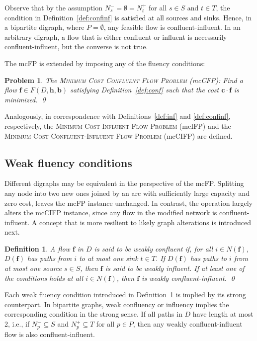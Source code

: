\documentclass[pdflatex,sn-mathphys-num]{sn-jnl}%
\theoremstyle{thmstyleone}%
\newtheorem{definition}[theorem]{Definition}%
\newtheorem{problem}[theorem]{Problem}%
\begin{document}
Observe that by the assumption $N_s^-=\emptyset=N_t^+$ for all $s\in S$ and $t\in T$,
the condition in Definition~\ref{def:confinf} is satisfied at all sources and sinks.
Hence, in a bipartite digraph, where $P=\emptyset$, any feasible flow is confluent-influent.
In an arbitrary digraph, a flow that is either confluent or influent is necessarily confluent-influent, but the converse is not true.

The mcFP is extended by imposing any of the fluency conditions:
\begin{problem} \label{prob:conf}
The \textsc{Minimum Cost Confluent Flow Problem} (mcCFP):
Find a flow $\boldsymbol{f}\in F(D,\boldsymbol{h},\boldsymbol{b})$ satisfying Definition~\ref{def:conf} such that the cost $\boldsymbol{c}\cdot\boldsymbol{f}$ is minimized.
\qed
\end{problem}
\noindent
Analogously, in correspondence with Definitions~\ref{def:inf} and \ref{def:confinf}, respectively, the 
\textsc{Minimum Cost Influent Flow Problem} (mcIFP) and the \textsc{Minimum Cost Confluent-Influent Flow Problem} (mcCIFP) are defined.

\subsection{Weak fluency conditions} \label{sec:weak}

Different digraphs may be equivalent in the perspective of the mcFP.
Splitting any node into two new ones joined by an arc with sufficiently large capacity and zero cost, leaves the mcFP instance unchanged.
In contrast, the operation largely alters the mcCIFP instance, since any flow in the modified network is confluent-influent.
A concept that is more resilient to likely graph alterations is introduced next.

\begin{definition} \label{def:weakconfinf}
A flow $\boldsymbol{f}$ in $D$ is said to be \emph{weakly confluent} if, for all $i\in N(\boldsymbol{f})$,
$D(\boldsymbol{f})$ has paths from $i$ to at most one sink $t\in T$.
If $D(\boldsymbol{f})$ has paths to $i$ from at most one source $s\in S$, then $\boldsymbol{f}$ is said to be \emph{weakly influent}.
If at least one of the conditions holds at all $i\in N(\boldsymbol{f})$, then $\boldsymbol{f}$ is \emph{weakly confluent-influent}.
\qed
\end{definition}

Each weak fluency condition introduced in Definition~\ref{def:weakconfinf} is implied by its strong counterpart.
In bipartite graphs, weak confluency or influency implies the corresponding condition in the strong sense.
If all paths in $D$ have length at most 2, i.e., if $N_p^-\subseteq S$ and $N_p^+\subseteq T$ for all $p\in P$, then any weakly confluent-influent flow is also
confluent-influent.
\end{document}
